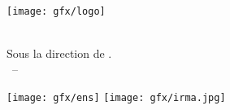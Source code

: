 
\begin{titlepage}

\begin{addmargin}[-1cm]{-3cm}
\begin{center}
\large

\hfill
\vfill

\begingroup
{}\spacedallcaps{\myTitle} \\ \bigskip %
\endgroup

\spacedlowsmallcaps{\myName} %

\vfill

\texttt{[image: gfx/logo]} \\ \medskip %

\mySubtitle \\ \medskip %
Sous la direction de \myProf.\\ \bigskip
\myTime\ -- \myVersion %


\vfill

\texttt{[image: gfx/ens]} \hfill \texttt{[image: gfx/irma.jpg]}

\end{center}
\end{addmargin}

\end{titlepage}